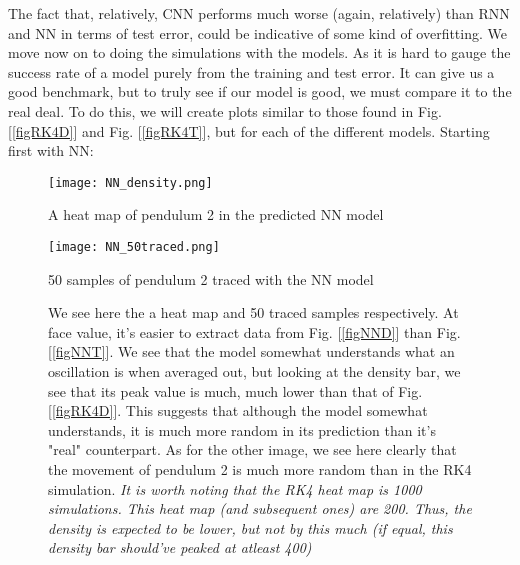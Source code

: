 \documentclass{article}
\begin{document}
\newline
The fact that, relatively, CNN performs much worse (again, relatively) than RNN and NN in terms of test error, could be indicative of some kind of overfitting.
We move now on to doing the simulations with the models. As it is hard to gauge the success rate of a model purely from the training and test error. It can give us a good benchmark, but to truly see if our model is good, we must compare it to the real deal. \newpage
To do this, we will create plots similar to those found in Fig. [\ref{figRK4D}] and Fig. [\ref{figRK4T}], but for each of the different models. 
Starting first with NN:
\begin{figure}[ht!]
    \centering
    
    \begin{minipage}{0.48\textwidth}
        \centering
        \texttt{[image: NN\_density.png]}
        \caption{A heat map of pendulum 2 in the predicted NN model}
        \label{figNND}
    \end{minipage}\hfill
    \begin{minipage}{0.48\textwidth}
        \centering
        \texttt{[image: NN\_50traced.png]}
        \caption{50 samples of pendulum 2 traced with the NN model}
        \label{figNNT}
    \end{minipage}

    \caption{We see here the a heat map and 50 traced samples respectively. At face value, it's easier to extract data from Fig. [\ref{figNND}] than Fig. [\ref{figNNT}]. We see that the model somewhat understands what an oscillation is when averaged out, but looking at the density bar, we see that its peak value is much, much lower than that of Fig. [\ref{figRK4D}]. This suggests that although the model somewhat understands, it is much more random in its prediction than it's "real" counterpart. As for the other image, we see here clearly that the movement of pendulum 2 is much more random than in the RK4 simulation. \newline
    \textit{It is worth noting that the RK4 heat map is 1000 simulations. This heat map (and subsequent ones) are 200. Thus, the density is expected to be lower, but not by this much (if equal, this density bar should've peaked at atleast 400)}}
    \label{figNN}
\end{figure}
\end{document}

